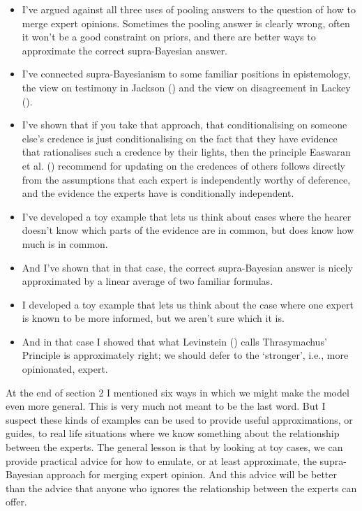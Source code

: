 \documentclass[
  10pt,
  letterpaper,
  DIV=11,
  numbers=noendperiod,
  twoside]{scrartcl}
\providecommand{\tightlist}{%
  \setlength{\itemsep}{0pt}\setlength{\parskip}{0pt}}\usepackage{longtable,booktabs,array}
\begin{document}
\begin{itemize}
\tightlist
\item
  I've argued against all three uses of pooling answers to the question
  of how to merge expert opinions. Sometimes the pooling answer is
  clearly wrong, often it won't be a good constraint on priors, and
  there are better ways to approximate the correct supra-Bayesian
  answer.
\item
  I've connected supra-Bayesianism to some familiar positions in
  epistemology, the view on testimony in Jackson
  () and the view on disagreement in
  Lackey ().
\item
  I've shown that if you take that approach, that conditionalising on
  someone else's credence is just conditionalising on the fact that they
  have evidence that rationalises such a credence by their lights, then
  the principle Easwaran et al. ()
  recommend for updating on the credences of others follows directly
  from the assumptions that each expert is independently worthy of
  deference, and the evidence the experts have is conditionally
  independent.
\item
  I've developed a toy example that lets us think about cases where the
  hearer doesn't know which parts of the evidence are in common, but
  does know how much is in common.
\item
  And I've shown that in that case, the correct supra-Bayesian answer is
  nicely approximated by a linear average of two familiar formulas.
\item
  I developed a toy example that lets us think about the case where one
  expert is known to be more informed, but we aren't sure which it is.
\item
  And in that case I showed that what Levinstein
  () calls Thrasymachus' Principle is
  approximately right; we should defer to the `stronger', i.e., more
  opinionated, expert.
\end{itemize}

At the end of section 2 I mentioned six ways in which we might make the
model even more general. This is very much not meant to be the last
word. But I suspect these kinds of examples can be used to provide
useful approximations, or guides, to real life situations where we know
something about the relationship between the experts. The general lesson
is that by looking at toy cases, we can provide practical advice for how
to emulate, or at least approximate, the supra-Bayesian approach for
merging expert opinion. And this advice will be better than the advice
that anyone who ignores the relationship between the experts can offer.
\end{document}
